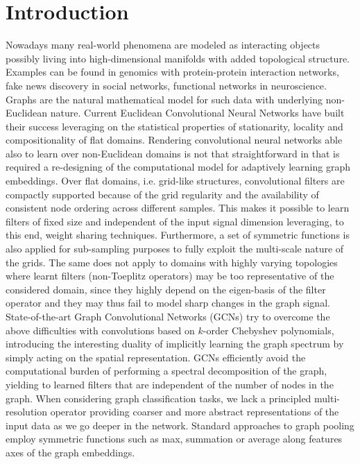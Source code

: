 \documentclass[runningheads]{llncs}
\begin{document}
\section{Introduction}
Nowadays many real-world phenomena are modeled as interacting objects possibly living into high-dimensional manifolds with added topological structure. Examples can be found in genomics with protein-protein interaction networks, fake news discovery in social networks, functional networks in neuroscience. Graphs are the natural mathematical model for such data with underlying non-Euclidean nature.
Current Euclidean Convolutional Neural Networks have built their success leveraging on the statistical properties of stationarity, locality and compositionality of flat domains. Rendering convolutional neural networks able also to learn over non-Euclidean domains is not that straightforward in that is required a re-designing of the computational model for adaptively learning graph embeddings.
Over flat domains, i.e. grid-like structures, convolutional filters are compactly supported because of the grid regularity and the availability of consistent node ordering across different samples. This makes it possible to learn filters of fixed size and independent of the input signal dimension leveraging, to this end, weight sharing techniques. Furthermore, a set of symmetric functions is also applied for sub-sampling purposes to fully exploit the multi-scale nature of the grids.
The same does not apply to domains with highly varying topologies where learnt filters (non-Toeplitz operators) may be too representative of the considered domain, since they highly depend on the eigen-basis of the filter operator and they may thus fail to model sharp changes in the graph signal.
State-of-the-art Graph Convolutional Networks (GCNs) \cite{DBLP:journals/corr/DefferrardBV16,DBLP:journals/corr/KipfW16} try to overcome the above difficulties with convolutions based on $k$-order Chebyshev polynomials, introducing the interesting duality of implicitly learning the graph spectrum by simply acting on the spatial representation. GCNs efficiently avoid the computational burden of performing a spectral decomposition of the graph, yielding to learned filters that are independent of the number of nodes in the graph.  When considering graph classification tasks, we lack a principled multi-resolution operator providing coarser and more abstract representations of the input data as we go deeper in the network. Standard approaches to graph pooling employ symmetric functions such as max, summation or average along features axes of the graph embeddings.
\end{document}
